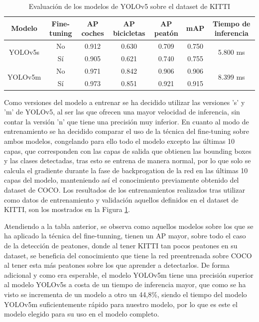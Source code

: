 \begin{table}[H]
\centering
\begin{tabular}{@{}ccccccc@{}}
\toprule
Modelo                   & Fine-tuning & AP coches & AP bicicletas & AP peatón & mAP & Tiempo de inferencia  \\ \midrule
\multirow{2}{*}{YOLOv5s} & No          & 0.912         & 0.630             & 0.709         & 0.750   & \multirow{2}{*}{5.800 ms} \\
                         & Sí          & 0.905         & 0.621             & 0.740         & 0.755   &                       \\
\multirow{2}{*}{YOLOv5m} & No          & 0.971         & 0.842             & 0.906         & 0.906   & \multirow{2}{*}{8.399 ms} \\
                         & Sí          & 0.973         & 0.851             & 0.921         & 0.915   &                       \\ \bottomrule
\end{tabular}
\caption{Evaluación de los modelos de YOLOv5 sobre el dataset de KITTI}
\label{tab:Evaluación de los modelos de YOLOv5 sobre el dataset de KITTI}
\end{table}

Como versiones del modelo a entrenar se ha decidido utilizar las versiones 's' y 'm' de YOLOv5, al ser las que ofrecen una mayor velocidad de inferencia, sin contar la versión 'n' que tiene una precisión muy inferior. En cuanto al modo de entrenamiento se ha decidido comparar el uso de la técnica del fine-tuning sobre ambos modelos, congelando para ello todo el modelo excepto las últimas 10 capas, que corresponden con las capas de salida que obtienen las bounding boxes y las clases detectadas, tras esto se entrena de manera normal, por lo que solo se calcula el gradiente durante la fase de backprogation de la red en las últimas 10 capas del modelo, manteniendo así el conocimiento previamente obtenido del dataset de COCO. Los resultados de los entrenamientos realizados tras utilizar como datos de entrenamiento y validación aquellos definidos en el dataset de KITTI, son los mostrados en la Figura \ref{tab:Evaluación de los modelos de YOLOv5 sobre el dataset de KITTI}.

Atendiendo a la tabla anterior, se observa como aquellos modelos sobre los que se ha aplicado la técnica del fine-tunning, tienen un \ac{AP} mayor, sobre todo el caso de la detección de peatones, donde al tener KITTI tan pocos peatones en su dataset, se beneficia del conocimiento que tiene la red preentrenada sobre COCO al tener esta más peatones sobre los que aprender a detectarlos. De forma adicional y como era esperable, el modelo YOLOv5m tiene una precisión superior al modelo YOLOv5s a costa de un tiempo de inferencia mayor, que como se ha visto se incrementa de un modelo a otro un 44,8\%, siendo el tiempo del modelo YOLOv5m suficientemente rápido para nuestro modelo, por lo que es este el modelo elegido para su uso en el modelo completo.

